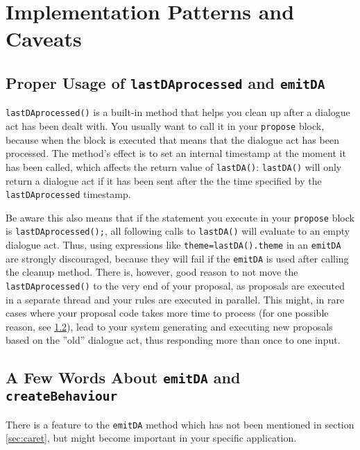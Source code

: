 \section{Implementation Patterns and Caveats}

\subsection{Proper Usage of \texttt{lastDAprocessed} and \texttt{emitDA}}
\label{lastDAprocessed}

\texttt{lastDAprocessed()} is a built-in method that helps you clean up after a dialogue act has been dealt with. You usually want to call it in your \texttt{propose} block, because when the block is executed that means that the dialogue act has been processed. The method's effect is to set an internal timestamp at the moment it has been called, which affects the return value of \texttt{lastDA()}: \texttt{lastDA()} will only return a dialogue act if it has been sent after the the time specified by the \texttt{lastDAprocessed} timestamp.

Be aware this also means that if the statement you execute in your \texttt{propose} block is \texttt{lastDAprocessed();}, all following calls to \texttt{lastDA()} will evaluate to an empty dialogue act. Thus, using expressions like \texttt{theme=lastDA().theme} in an \texttt{emitDA} are strongly discouraged, because they will fail if the \texttt{emitDA} is used after calling the cleanup method. There is, however, good reason to not move the \texttt{lastDAprocessed()} to the very end of your proposal, as proposals are executed in a separate thread and your 
\vonda rules are executed in parallel. This might, in rare cases where your proposal code takes more time to process (for one possible reason, see \ref{emitDA}), lead to your system generating and executing new proposals based on the ''old'' dialogue act, thus responding more than once to one input.

\subsection{A Few Words About \texttt{emitDA} and \texttt{createBehaviour}} \label{emitDA}

There is a feature to the \texttt{emitDA} method which has not been mentioned in section \ref{sec:caret}, but might become important in your specific application.

